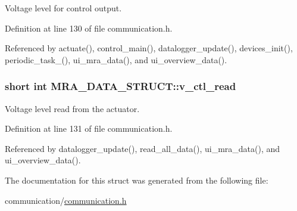 Voltage level for control output. 



Definition at line 130 of file communication.\-h.



Referenced by actuate(), control\-\_\-main(), datalogger\-\_\-update(), devices\-\_\-init(), periodic\-\_\-task\-\_(), ui\-\_\-mra\-\_\-data(), and ui\-\_\-overview\-\_\-data().

\hypertarget{structMRA__DATA__STRUCT_a3a31d57268c33b21ac915fdc27dfe474}{
\subsubsection[{v\-\_\-ctl\-\_\-read}]{\setlength{\rightskip}{0pt plus 5cm}short int M\-R\-A\-\_\-\-D\-A\-T\-A\-\_\-\-S\-T\-R\-U\-C\-T\-::v\-\_\-ctl\-\_\-read}}\label{structMRA__DATA__STRUCT_a3a31d57268c33b21ac915fdc27dfe474}


Voltage level read from the actuator. 



Definition at line 131 of file communication.\-h.



Referenced by datalogger\-\_\-update(), read\-\_\-all\-\_\-data(), ui\-\_\-mra\-\_\-data(), and ui\-\_\-overview\-\_\-data().



The documentation for this struct was generated from the following file\-:\begin{DoxyCompactItemize}
\item 
communication/\hyperlink{communication_2communication_8h}{communication.\-h}\end{DoxyCompactItemize}
